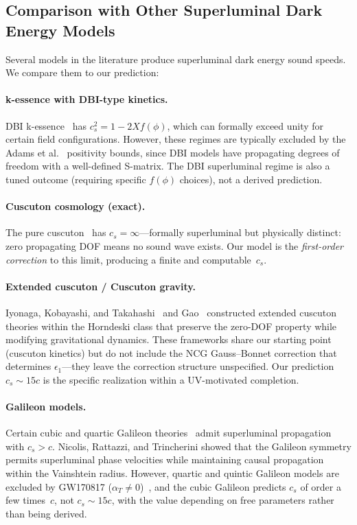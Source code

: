 \subsection{Comparison with Other Superluminal Dark Energy Models}
\label{sec:5-superluminal-comparison}

Several models in the literature produce superluminal dark energy sound speeds. We compare them to our prediction:

\paragraph{k-essence with DBI-type kinetics.}
DBI k-essence~\cite{ch5:ArmendarizPicon2000} has $c_s^2 = 1 - 2Xf(\phi)$, which can formally exceed unity for certain field configurations. However, these regimes are typically excluded by the Adams et al.~\cite{ch5:Adams2006} positivity bounds, since DBI models have propagating degrees of freedom with a well-defined S-matrix. The DBI superluminal regime is also a tuned outcome (requiring specific $f(\phi)$ choices), not a derived prediction.

\paragraph{Cuscuton cosmology (exact).}
The pure cuscuton~\cite{ch5:Afshordi2007} has $c_s = \infty$---formally superluminal but physically distinct: zero propagating DOF means no sound wave exists. Our model is the \emph{first-order correction} to this limit, producing a finite and computable~$c_s$.

\paragraph{Extended cuscuton / Cuscuton gravity.}
Iyonaga, Kobayashi, and Takahashi~\cite{ch5:Iyonaga2018} and Gao~\cite{ch5:Gao2014} constructed extended cuscuton theories within the Horndeski class that preserve the zero-DOF property while modifying gravitational dynamics. These frameworks share our starting point (cuscuton kinetics) but do not include the NCG Gauss--Bonnet correction that determines $\epsilon_1$---they leave the correction structure unspecified. Our prediction $c_s \sim 15c$ is the specific realization within a UV-motivated completion.

\paragraph{Galileon models.}
Certain cubic and quartic Galileon theories~\cite{ch5:Nicolis2009} admit superluminal propagation with $c_s > c$. Nicolis, Rattazzi, and Trincherini showed that the Galileon symmetry permits superluminal phase velocities while maintaining causal propagation within the Vainshtein radius. However, quartic and quintic Galileon models are excluded by GW170817 ($\alpha_T \neq 0$)~\cite{ch5:GW170817}, and the cubic Galileon predicts $c_s$ of order a few times~$c$, not $c_s \sim 15c$, with the value depending on free parameters rather than being derived.

